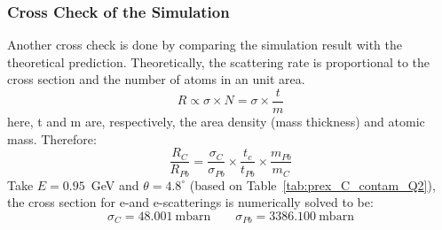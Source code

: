 \subsubsection{Cross Check of the Simulation}
Another cross check is done by comparing the simulation result with the 
theoretical prediction. Theoretically,
the scattering rate is proportional to the cross section and the number of atoms
in an unit area. 
\begin{equation}
    R \propto \sigma \times N = \sigma \times \frac{t}{m}
\end{equation}
here, t and m are, respectively, the area density (mass thickness) and atomic mass. 
Therefore:
\begin{equation}
    \frac{R_C}{R_{Pb}} = \frac{\sigma_C}{\sigma_{Pb}} \times \frac{t_c}{t_{Pb}} \times \frac{m_{Pb}}{m_C}
\end{equation}
Take $E = 0.95$~GeV and $\theta = 4.8^\circ$ (based on Table~\ref{tab:prex_C_contam_Q2}), 
the cross section for e-\Carbon and e-\Pb scatterings is numerically solved to be:
\begin{equation}
    \sigma_C = 48.001\ \mathrm{mbarn}	\qquad \sigma_{Pb} = 3386.100\ \mathrm{mbarn}	
\end{equation}

